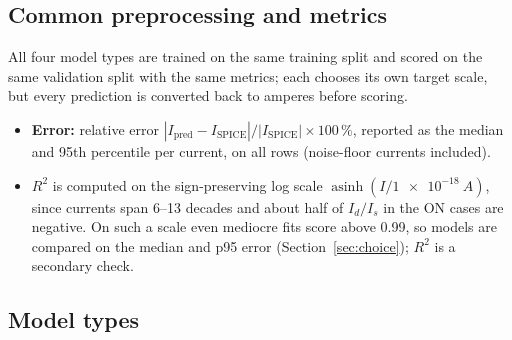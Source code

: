 \documentclass[11pt,a4paper]{article}
\begin{document}
\subsection{Common preprocessing and metrics}
All four model types are trained on the same training split and scored on the same validation
split with the same metrics; each chooses its own target scale, but every prediction is converted
back to amperes before scoring.
\begin{itemize}
  \item \textbf{Error:} relative error $|I_{\mathrm{pred}}-I_{\mathrm{SPICE}}|/|I_{\mathrm{SPICE}}|\times100\,\%$, reported as
        the median and 95th percentile per current, on all rows (noise-floor currents included).
  \item \textbf{$R^2$} is computed on the sign-preserving log scale $\operatorname{asinh}(I/\SI{1e-18}{A})$, since
        currents span 6--13 decades and about half of $I_d/I_s$ in the ON cases are negative. On such a
        scale even mediocre fits score above 0.99, so models are compared on the median and p95 error
        (Section~\ref{sec:choice}); $R^2$ is a secondary check.
\end{itemize}

\subsection{Model types}
\end{document}
